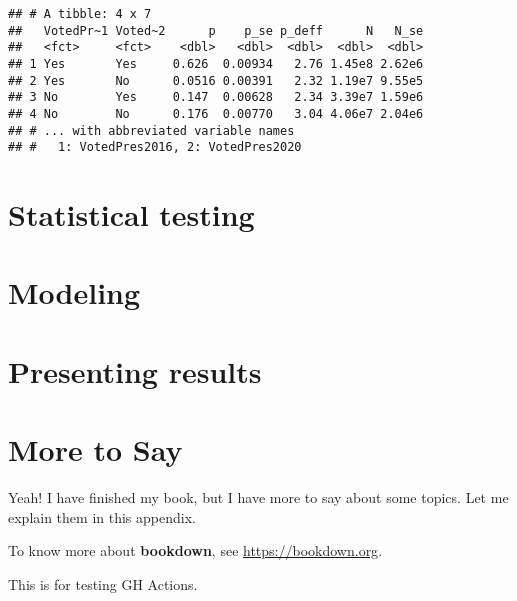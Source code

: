\documentclass[
]{krantz}
\begin{document}
\begin{verbatim}
## # A tibble: 4 x 7
##   VotedPr~1 Voted~2      p    p_se p_deff      N   N_se
##   <fct>     <fct>    <dbl>   <dbl>  <dbl>  <dbl>  <dbl>
## 1 Yes       Yes     0.626  0.00934   2.76 1.45e8 2.62e6
## 2 Yes       No      0.0516 0.00391   2.32 1.19e7 9.55e5
## 3 No        Yes     0.147  0.00628   2.34 3.39e7 1.59e6
## 4 No        No      0.176  0.00770   3.04 4.06e7 2.04e6
## # ... with abbreviated variable names
## #   1: VotedPres2016, 2: VotedPres2020
\end{verbatim}

\hypertarget{c07}{%
\chapter{Statistical testing}\label{c07}}

\hypertarget{c08}{%
\chapter{Modeling}\label{c08}}

\hypertarget{c09}{%
\chapter{Presenting results}\label{c09}}

\cleardoublepage

\hypertarget{appendix-appendix}{%
\appendix {}}


\hypertarget{more-to-say}{%
\chapter{More to Say}\label{more-to-say}}

Yeah! I have finished my book, but I have more to say about some topics. Let me explain them in this appendix.

To know more about \textbf{bookdown}, see \url{https://bookdown.org}.

This is for testing GH Actions.

  

\backmatter
\printindex
\end{document}
